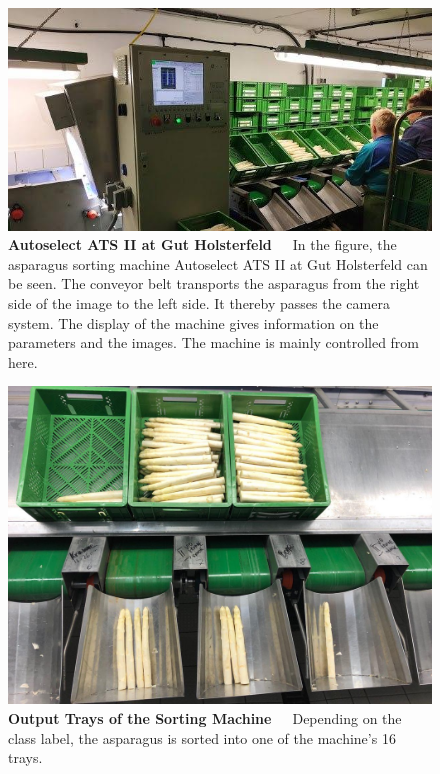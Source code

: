 \begin{figure}[h]
	\centering
	\includegraphics[scale=0.6]{Figures/chapter02/sortingmachine_front.png}
	\decoRule
	\caption[The Autoselect ATS II at Gut Holsterfeld]{\textbf{Autoselect ATS II at Gut Holsterfeld}~~~In the figure, the asparagus sorting machine Autoselect ATS II at Gut Holsterfeld can be seen. The conveyor belt transports the asparagus from the right side of the image to the left side. It thereby passes the camera system. The display of the machine gives information on the parameters and the images. The machine is mainly controlled from here.}
	\label{fig:SortingMachine}
\end{figure}

\begin{figure}[h]
	\centering
	\includegraphics[scale=0.3]{Figures/chapter02/sorting_machine_slots.png}
	\decoRule
	\caption[Output Trays of the Sorting Machine]{\textbf{Output Trays of the Sorting Machine}~~~Depending on the class label, the asparagus is sorted into one of the machine's 16 trays.}
	\label{fig:SortingMachineSlots}
\end{figure}

